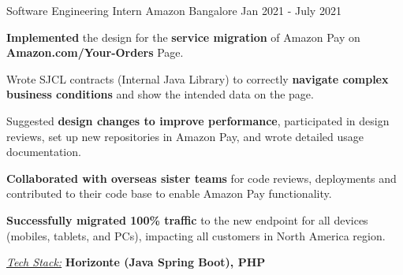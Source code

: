 \documentclass[11pt, a4paper]{awesome-cv} %
\begin{document}
\begin{cventries}
  \cventry
    {Software Engineering Intern} %
    {Amazon} %
    {Bangalore} %
    {Jan 2021 - July 2021} %
    {
      \begin{cvitems} %
        \item {\textbf{Implemented} the design for the \textbf{service migration} of Amazon Pay on \textbf{Amazon.com/Your-Orders} Page.}
        \item {Wrote SJCL contracts (Internal Java Library) to correctly \textbf{navigate complex business conditions} and show the intended data on the page.}
        \item Suggested \textbf{design changes to improve performance}, participated in design reviews, set up new repositories in Amazon Pay, and wrote detailed usage documentation.
        \item {\textbf{Collaborated with overseas sister teams} for code reviews, deployments and contributed to their code base to enable Amazon Pay functionality.}
        \item {\textbf{Successfully migrated 100\% traffic} to the new endpoint for all devices (mobiles, tablets, and PCs), impacting all customers in North America region.}
        \item {\textit{\href{}{\color{awesome-red} Tech Stack:}} \textbf{Horizonte (Java Spring Boot), PHP}}
      \end{cvitems}
    }

\end{cventries}





\end{document}
